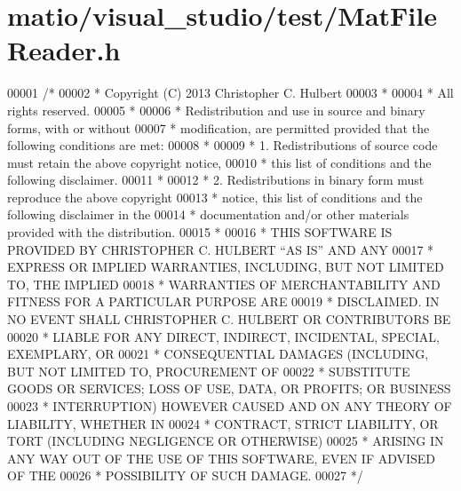 \hypertarget{matio_2visual__studio_2test_2_mat_file_reader_8h_source}{}\section{matio/visual\+\_\+studio/test/\+Mat\+File\+Reader.h}
\label{matio_2visual__studio_2test_2_mat_file_reader_8h_source}

\begin{DoxyCode}
00001 \textcolor{comment}{/*}
00002 \textcolor{comment}{* Copyright (C) 2013   Christopher C. Hulbert}
00003 \textcolor{comment}{*}
00004 \textcolor{comment}{* All rights reserved.}
00005 \textcolor{comment}{*}
00006 \textcolor{comment}{* Redistribution and use in source and binary forms, with or without}
00007 \textcolor{comment}{* modification, are permitted provided that the following conditions are met:}
00008 \textcolor{comment}{*}
00009 \textcolor{comment}{*    1. Redistributions of source code must retain the above copyright notice,}
00010 \textcolor{comment}{*       this list of conditions and the following disclaimer.}
00011 \textcolor{comment}{*}
00012 \textcolor{comment}{*    2. Redistributions in binary form must reproduce the above copyright}
00013 \textcolor{comment}{*       notice, this list of conditions and the following disclaimer in the}
00014 \textcolor{comment}{*       documentation and/or other materials provided with the distribution.}
00015 \textcolor{comment}{*}
00016 \textcolor{comment}{* THIS SOFTWARE IS PROVIDED BY CHRISTOPHER C. HULBERT ``AS IS'' AND ANY}
00017 \textcolor{comment}{* EXPRESS OR IMPLIED WARRANTIES, INCLUDING, BUT NOT LIMITED TO, THE IMPLIED}
00018 \textcolor{comment}{* WARRANTIES OF MERCHANTABILITY AND FITNESS FOR A PARTICULAR PURPOSE ARE}
00019 \textcolor{comment}{* DISCLAIMED. IN NO EVENT SHALL CHRISTOPHER C. HULBERT OR CONTRIBUTORS BE}
00020 \textcolor{comment}{* LIABLE FOR ANY DIRECT, INDIRECT, INCIDENTAL, SPECIAL, EXEMPLARY, OR}
00021 \textcolor{comment}{* CONSEQUENTIAL DAMAGES (INCLUDING, BUT NOT LIMITED TO, PROCUREMENT OF}
00022 \textcolor{comment}{* SUBSTITUTE GOODS OR SERVICES; LOSS OF USE, DATA, OR PROFITS; OR BUSINESS}
00023 \textcolor{comment}{* INTERRUPTION) HOWEVER CAUSED AND ON ANY THEORY OF LIABILITY, WHETHER IN}
00024 \textcolor{comment}{* CONTRACT, STRICT LIABILITY, OR TORT (INCLUDING NEGLIGENCE OR OTHERWISE)}
00025 \textcolor{comment}{* ARISING IN ANY WAY OUT OF THE USE OF THIS SOFTWARE, EVEN IF ADVISED OF THE}
00026 \textcolor{comment}{* POSSIBILITY OF SUCH DAMAGE.}
00027 \textcolor{comment}{*/}

\end{DoxyCode}
